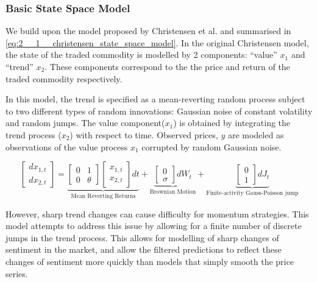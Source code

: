 \documentclass[../main.tex]{subfiles}
\begin{document}
\subsubsection{Basic State Space Model}

We build upon the model proposed by Christensen et al. \cite{christensen2012forecasting} and summarised in \autoref{eq:2__1__christensen_state_space_model}. In the original Christensen model, the state of the traded commodity is modelled by 2 components: ``value'' $x_1$ and ``trend'' $x_2$. These components correspond to the the price and return of the traded commodity respectively. 

In this model, the trend is specified as a mean-reverting random process subject to two different types of random innovations: Gaussian noise of constant volatility and random jumps. The value component($x_1$) is obtained by integrating the trend process ($x_2$) with respect to time. Observed prices, $y$ are modeled as observations of the value process $x_1$ corrupted by random Gaussian noise. 
 
\begin{equation}
    \begin{bmatrix}
    dx_{1,t} \\ dx_{2,t}
    \end{bmatrix} = 
    \underbrace{
        \begin{bmatrix}
        0 & 1 \\ 0 & \theta
        \end{bmatrix}
        \begin{bmatrix}
        x_{1,t} \\ x_{2,t}
        \end{bmatrix} dt
    }_{\text{Mean Reverting Returns}} 
    + 
    \underbrace{
        \begin{bmatrix}
        0 \\ \sigma
        \end{bmatrix} dW_t
    }_{\text{Brownian Motion}}
    + 
    \underbrace{
        \begin{bmatrix}
        0 \\ 1
        \end{bmatrix} dJ_t
    }_{\text{Finite-activity Gauss-Poisson jump}}
    \label{eq:2__1__christensen_state_space_model}
\end{equation}

However, sharp trend changes can cause difficulty for momentum strategies. This model attempts to address this issue by allowing for a finite number of discrete jumps in the trend process. This allows for modelling of sharp changes of sentiment in the market, and allow the filtered predictions to reflect these changes of sentiment more quickly than models that simply smooth the price series. 
\end{document}
